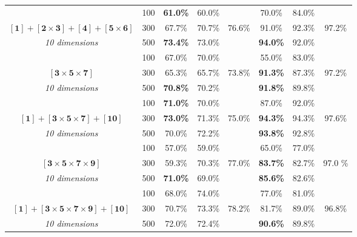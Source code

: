 \documentclass[a4paper,12pt ]{report}
\begin{document}
\begin{table}[h]
\begin{center}
{\begin{tabular}{|c |  c | c | r c  | c | c c | }
 &100 & \textbf{61.0\%} & 	60.0\% & 	 &  70.0\% & 	84.0\% & \\ 
$\bm{{[1]} + {[2\times 3]} + {[4]} + {[5\times 6]}  } $ & 300 & 67.7\% & 	70.7\% &  76.6\% &  91.0\% & 	92.3\% & 97.2\% \\ 
\emph{10 dimensions}& 500 & \textbf{73.4\%} & 	73.0\% & 	 &  \textbf{94.0\%} & 	92.0\% &  \\  \hline


&100 &  67.0\% & 70.0\% & & 55.0\% & 83.0\% &  \\ 
$\bm{{[3\times5\times7]}} $ & 300 & 65.3\% & 65.7\% & 73.8\% & \textbf{91.3\%} & 87.3\% & 97.2\%  \\ 
\emph{10 dimensions}& 500 & \textbf{70.8\%} & 70.2\% & & \textbf{91.8\%} & 89.8\% &  \\    \hline


 &100 & \textbf{71.0\%}  & 70.0\% & 	& 87.0\% & 92.0\% & \\  
$\bm{{[1]} + {[3\times5\times7]}  +  {[10]}} $ & 300 & \textbf{73.0\%}  & 71.3\% & 75.0\% & \textbf{94.3\%} & 94.3\% & 97.6\% \\ 
\emph{10 dimensions}& 500 &  70.0\%  & 72.2\% & 	& \textbf{93.8\%} & 92.8\% & \\ \hline


&100 & 57.0\% & 59.0\% &  &	65.0\% & 77.0\% & \\ 
$\bm{{[3\times5\times7\times9]}} $ & 300 & 59.3\% & 70.3\% & 77.0\% &    \textbf{83.7\%} & 82.7\% & 97.0 \% \\ 
\emph{10 dimensions}& 500 & \textbf{71.0\%} & 	69.0\% & & \textbf{85.6\%} & 82.6\% & \\   \hline


 &100 & 68.0\% & 74.0\% &  & 77.0\% & 	81.0\% &  \\ 
$\bm{ {[1]} + {[3\times 5\times 7\times 9]}  + {[10]} }$  & 300 & 70.7\% & 73.3\% & 78.2\% & 81.7\% & 89.0\% &  96.8\% \\ 
\emph{10 dimensions} & 500 & 72.0\% & 72.4\% &  & \textbf{90.6\%} & 	89.8\% &  \\ 
 
\hline
\end{tabular}
}     

 \end{center}

\end{table}
\end{document}
